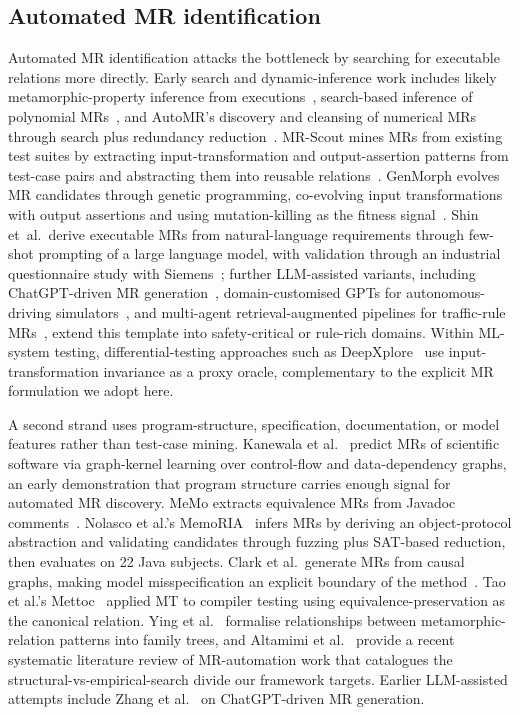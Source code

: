 \documentclass[manuscript]{acmart}
\begin{document}
\subsection{Automated MR identification}

Automated MR identification attacks the bottleneck by searching for executable relations more directly. Early search and dynamic-inference work includes likely metamorphic-property inference from executions~\cite{Su2015LikelyMR}, search-based inference of polynomial MRs~\cite{Zhang2014PolynomialMR}, and AutoMR's discovery and cleansing of numerical MRs through search plus redundancy reduction~\cite{Zhang2019AutoMR}. MR-Scout mines MRs from existing test suites by extracting input-transformation and output-assertion patterns from test-case pairs and abstracting them into reusable relations~\cite{MRScout2024}. GenMorph evolves MR candidates through genetic programming, co-evolving input transformations with output assertions and using mutation-killing as the fitness signal~\cite{GenMorph2024}. Shin et~al.\ derive executable MRs from natural-language requirements through few-shot prompting of a large language model, with validation through an industrial questionnaire study with Siemens~\cite{Shin2024}; further LLM-assisted variants, including ChatGPT-driven MR generation~\cite{ZhangChatGPTMR2023}, domain-customised GPTs for autonomous-driving simulators~\cite{GPTMR2025}, and multi-agent retrieval-augmented pipelines for traffic-rule MRs~\cite{AutoMT2025}, extend this template into safety-critical or rule-rich domains. Within ML-system testing, differential-testing approaches such as DeepXplore~\cite{DeepXplore2017} use input-transformation invariance as a proxy oracle, complementary to the explicit MR formulation we adopt here.

A second strand uses program-structure, specification, documentation, or model features rather than test-case mining. Kanewala et al.~\cite{Kanewala2016GraphKernel} predict MRs of scientific software via graph-kernel learning over control-flow and data-dependency graphs, an early demonstration that program structure carries enough signal for automated MR discovery. MeMo extracts equivalence MRs from Javadoc comments~\cite{Blasi2021MeMo}. Nolasco et al.'s MemoRIA~\cite{Nolasco2024MemoRIA} infers MRs by deriving an object-protocol abstraction and validating candidates through fuzzing plus SAT-based reduction, then evaluates on 22 Java subjects. Clark et al.\ generate MRs from causal graphs, making model misspecification an explicit boundary of the method~\cite{Clark2023CausalMT}. Tao et al.'s Mettoc~\cite{Tao2010Mettoc} applied MT to compiler testing using equivalence-preservation as the canonical relation. Ying et al.~\cite{Ying2025MRPatterns} formalise relationships between metamorphic-relation patterns into family trees, and Altamimi et al.~\cite{Altamimi2022MRSLR} provide a recent systematic literature review of MR-automation work that catalogues the structural-vs-empirical-search divide our framework targets. Earlier LLM-assisted attempts include Zhang et al.~\cite{ZhangChatGPTMR2023} on ChatGPT-driven MR generation.
\end{document}
